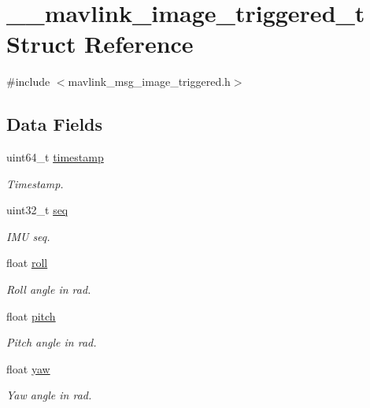 \hypertarget{struct____mavlink__image__triggered__t}{\section{\+\_\+\+\_\+mavlink\+\_\+image\+\_\+triggered\+\_\+t Struct Reference}
\label{struct____mavlink__image__triggered__t}
}


{\ttfamily \#include $<$mavlink\+\_\+msg\+\_\+image\+\_\+triggered.\+h$>$}

\subsection*{Data Fields}
\begin{DoxyCompactItemize}
\item 
uint64\+\_\+t \hyperlink{struct____mavlink__image__triggered__t_a0c6f8978d3472905eaefdd5ac764f18a}{timestamp}
\begin{DoxyCompactList}\small\item\em Timestamp. \end{DoxyCompactList}\item 
uint32\+\_\+t \hyperlink{struct____mavlink__image__triggered__t_aad40e161ce4c73402422481914133978}{seq}
\begin{DoxyCompactList}\small\item\em I\+M\+U seq. \end{DoxyCompactList}\item 
float \hyperlink{struct____mavlink__image__triggered__t_a6f55938269455fcd88372e4c84b4c5dd}{roll}
\begin{DoxyCompactList}\small\item\em Roll angle in rad. \end{DoxyCompactList}\item 
float \hyperlink{struct____mavlink__image__triggered__t_a226476112557c85a69e8c212ebab2864}{pitch}
\begin{DoxyCompactList}\small\item\em Pitch angle in rad. \end{DoxyCompactList}\item 
float \hyperlink{struct____mavlink__image__triggered__t_a9f7c41e8245718ab4d548dfc9042a676}{yaw}
\begin{DoxyCompactList}\small\item\em Yaw angle in rad. \end{DoxyCompactList}\item 

\end{DoxyCompactItemize}
